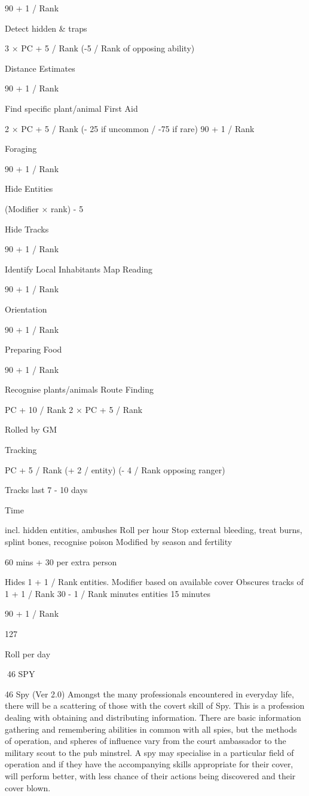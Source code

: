 \documentclass[a4paper]{article}
\begin{document}
\begin{multicols}{3}
90 + 1 / Rank

Detect hidden & traps

3 × PC + 5 / Rank (-5 / Rank of opposing ability)

Distance Estimates

90 + 1 / Rank

Find specific
plant/animal
First Aid

2 × PC + 5 / Rank (- 25 if uncommon / -75 if
rare)
90 + 1 / Rank

Foraging

90 + 1 / Rank

Hide Entities

(Modifier × rank) - 5

Hide Tracks

90 + 1 / Rank

Identify Local
Inhabitants
Map Reading

90 + 1 / Rank

Orientation

90 + 1 / Rank

Preparing Food

90 + 1 / Rank

Recognise
plants/animals
Route Finding

PC + 10 / Rank
2 × PC + 5 / Rank

Rolled by GM

Tracking

PC + 5 / Rank (+ 2 / entity) (- 4 / Rank opposing
ranger)

Tracks last 7 - 10 days

Time

incl. hidden entities, ambushes
Roll per hour
Stop external bleeding, treat
burns, splint bones, recognise poison
Modified by season and fertility

60 mins + 30 per extra
person

Hides 1 + 1 / Rank entities. Modifier based on available
cover
Obscures tracks of 1 + 1 / Rank
30 - 1 / Rank minutes
entities
15 minutes

90 + 1 / Rank

127

Roll per day

46 SPY

46 Spy (Ver 2.0)
Amongst the many professionals encountered in
everyday life, there will be a scattering of those
with the covert skill of Spy. This is a profession
dealing with obtaining and distributing information. There are basic information gathering and
remembering abilities in common with all spies,
but the methods of operation, and spheres of influence vary from the court ambassador to the military scout to the pub minstrel. A spy may specialise
in a particular field of operation and if they have
the accompanying skills appropriate for their
cover, will perform better, with less chance of their
actions being discovered and their cover blown.


\end{multicols}
\end{document}

